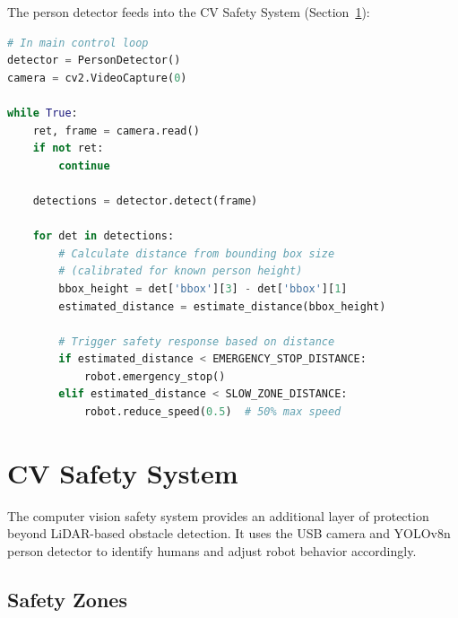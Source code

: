 \documentclass[11pt,letterpaper]{article}
\begin{document}
The person detector feeds into the CV Safety System (Section~\ref{sec:cv-safety}):

\begin{lstlisting}[language=Python, caption=Integration with safety pipeline]
# In main control loop
detector = PersonDetector()
camera = cv2.VideoCapture(0)

while True:
    ret, frame = camera.read()
    if not ret:
        continue

    detections = detector.detect(frame)

    for det in detections:
        # Calculate distance from bounding box size
        # (calibrated for known person height)
        bbox_height = det['bbox'][3] - det['bbox'][1]
        estimated_distance = estimate_distance(bbox_height)

        # Trigger safety response based on distance
        if estimated_distance < EMERGENCY_STOP_DISTANCE:
            robot.emergency_stop()
        elif estimated_distance < SLOW_ZONE_DISTANCE:
            robot.reduce_speed(0.5)  # 50% max speed
\end{lstlisting}

\section{CV Safety System}
\label{sec:cv-safety}

The computer vision safety system provides an additional layer of protection beyond LiDAR-based obstacle detection. It uses the USB camera and YOLOv8n person detector to identify humans and adjust robot behavior accordingly.

\subsection{Safety Zones}
\end{document}
